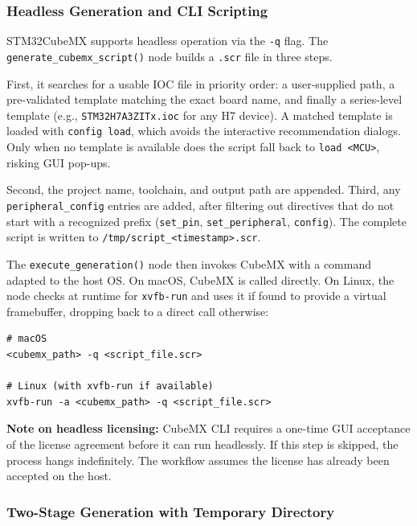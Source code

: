 \subsubsection{Headless Generation and CLI Scripting}

STM32CubeMX supports headless operation via the \texttt{-q} flag. The \texttt{generate\_\allowbreak cubemx\_\allowbreak script()} node builds a \texttt{.scr} file in three steps.

First, it searches for a usable IOC file in priority order: a user-supplied path, a pre-validated template matching the exact board name, and finally a series-level template (e.g., \texttt{STM32H7A3ZITx.ioc} for any H7 device). A matched template is loaded with \texttt{config load}, which avoids the interactive recommendation dialogs. Only when no template is available does the script fall back to \texttt{load \textless MCU\textgreater}, risking GUI pop-ups.

Second, the project name, toolchain, and output path are appended. Third, any \texttt{peripheral\_config} entries are added, after filtering out directives that do not start with a recognized prefix (\texttt{set\_pin}, \texttt{set\_peripheral}, \texttt{config}). The complete script is written to \texttt{/tmp/script\_\textless timestamp\textgreater.scr}.

The \texttt{execute\_generation()} node then invokes CubeMX with a command adapted to the host OS. On macOS, CubeMX is called directly. On Linux, the node checks at runtime for \texttt{xvfb-run} and uses it if found to provide a virtual framebuffer, dropping back to a direct call otherwise:

\begin{verbatim}
# macOS
<cubemx_path> -q <script_file.scr>

# Linux (with xvfb-run if available)
xvfb-run -a <cubemx_path> -q <script_file.scr>
\end{verbatim}

\textbf{Note on headless licensing:} CubeMX CLI requires a one-time GUI acceptance of the license agreement before it can run headlessly. If this step is skipped, the process hangs indefinitely. The workflow assumes the license has already been accepted on the host.

\subsubsection{Two-Stage Generation with Temporary Directory}
\label{subsec:two_stage_gen}

